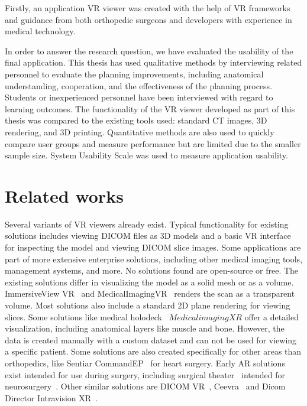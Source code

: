 \documentclass[a4paper]{report}
\begin{document}
Firstly, an application VR viewer was created with the help of VR frameworks and guidance from both orthopedic surgeons and developers with experience in medical technology.

In order to answer the research question, we have evaluated the usability of the final application.
This thesis has used qualitative methods by interviewing related personnel to evaluate the planning improvements, including anatomical understanding, cooperation, and the effectiveness of the planning process. Students or inexperienced personnel have been interviewed with regard to learning outcomes.
The functionality of the VR viewer developed as part of this thesis was compared to the existing tools used: standard CT images, 3D rendering, and 3D printing.
Quantitative methods are also used to quickly compare user groups and measure performance but are limited due to the smaller sample size. System Usability Scale was used to measure application usability.

\section{Related works}

Several variants of VR viewers already exist. Typical functionality for existing solutions includes viewing DICOM files as 3D models and a basic VR interface for inspecting the model and viewing DICOM slice images. Some applications are part of more extensive enterprise solutions, including other medical imaging tools, management systems, and more. No solutions found are open-source or free.
The existing solutions differ in visualizing the model as a solid mesh or as a volume. ImmersiveView VR~\cite{noauthor_immersiveview_nodate} and MedicalImagingVR~\cite{noauthor_medicalimagingvr_nodate} renders the scan as a transparent volume. Most solutions also include a standard 2D plane rendering for viewing slices.
Some solutions like medical holodeck~\cite{medical_holodeck_medicalholodeck_nodate} $Medical imaging XR$ offer a detailed visualization, including anatomical layers like muscle and bone. However, the data is created manually with a custom dataset and can not be used for viewing a specific patient.
Some solutions are also created specifically for other areas than orthopedics, like Sentiar CommandEP~\cite{noauthor_commandep_nodate} for heart surgery.
Early AR solutions exist intended for use during surgery, including surgical theater~\cite{noauthor_virtual_nodate} intended for neurosurgery~\cite{anthony_patient-specific_2021}.
Other similar solutions are DICOM VR~\cite{noauthor_dicom_nodate-1}, Ceevra~\cite{ceevra_inc_using_2019} and Dicom Director Intravision XR~\cite{dicomdirectorcom_surgeons_nodate}.
\end{document}
